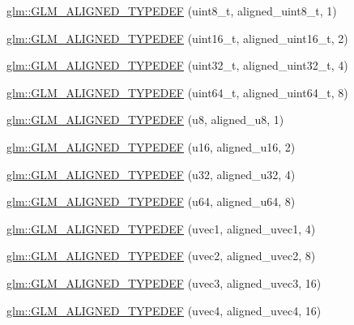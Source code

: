 \begin{DoxyCompactItemize}
\item 
\hyperlink{group__gtx__type__aligned_gaf6ced36f13bae57f377bafa6f5fcc299}{glm\-::\-G\-L\-M\-\_\-\-A\-L\-I\-G\-N\-E\-D\-\_\-\-T\-Y\-P\-E\-D\-E\-F} (uint8\-\_\-t, aligned\-\_\-uint8\-\_\-t, 1)
\item 
\hyperlink{group__gtx__type__aligned_gafbc7fb7847bfc78a339d1d371c915c73}{glm\-::\-G\-L\-M\-\_\-\-A\-L\-I\-G\-N\-E\-D\-\_\-\-T\-Y\-P\-E\-D\-E\-F} (uint16\-\_\-t, aligned\-\_\-uint16\-\_\-t, 2)
\item 
\hyperlink{group__gtx__type__aligned_gaa86bc56a73fd8120b1121b5f5e6245ae}{glm\-::\-G\-L\-M\-\_\-\-A\-L\-I\-G\-N\-E\-D\-\_\-\-T\-Y\-P\-E\-D\-E\-F} (uint32\-\_\-t, aligned\-\_\-uint32\-\_\-t, 4)
\item 
\hyperlink{group__gtx__type__aligned_ga68c0b9e669060d0eb5ab8c3ddeb483d8}{glm\-::\-G\-L\-M\-\_\-\-A\-L\-I\-G\-N\-E\-D\-\_\-\-T\-Y\-P\-E\-D\-E\-F} (uint64\-\_\-t, aligned\-\_\-uint64\-\_\-t, 8)
\item 
\hyperlink{group__gtx__type__aligned_ga4f3bab577daf3343e99cc005134bce86}{glm\-::\-G\-L\-M\-\_\-\-A\-L\-I\-G\-N\-E\-D\-\_\-\-T\-Y\-P\-E\-D\-E\-F} (u8, aligned\-\_\-u8, 1)
\item 
\hyperlink{group__gtx__type__aligned_ga13a2391339d0790d43b76d00a7611c4f}{glm\-::\-G\-L\-M\-\_\-\-A\-L\-I\-G\-N\-E\-D\-\_\-\-T\-Y\-P\-E\-D\-E\-F} (u16, aligned\-\_\-u16, 2)
\item 
\hyperlink{group__gtx__type__aligned_ga197570e03acbc3d18ab698e342971e8f}{glm\-::\-G\-L\-M\-\_\-\-A\-L\-I\-G\-N\-E\-D\-\_\-\-T\-Y\-P\-E\-D\-E\-F} (u32, aligned\-\_\-u32, 4)
\item 
\hyperlink{group__gtx__type__aligned_ga0f033b21e145a1faa32c62ede5878993}{glm\-::\-G\-L\-M\-\_\-\-A\-L\-I\-G\-N\-E\-D\-\_\-\-T\-Y\-P\-E\-D\-E\-F} (u64, aligned\-\_\-u64, 8)
\item 
\hyperlink{group__gtx__type__aligned_ga509af83527f5cd512e9a7873590663aa}{glm\-::\-G\-L\-M\-\_\-\-A\-L\-I\-G\-N\-E\-D\-\_\-\-T\-Y\-P\-E\-D\-E\-F} (uvec1, aligned\-\_\-uvec1, 4)
\item 
\hyperlink{group__gtx__type__aligned_ga94e86186978c502c6dc0c0d9c4a30679}{glm\-::\-G\-L\-M\-\_\-\-A\-L\-I\-G\-N\-E\-D\-\_\-\-T\-Y\-P\-E\-D\-E\-F} (uvec2, aligned\-\_\-uvec2, 8)
\item 
\hyperlink{group__gtx__type__aligned_ga5cec574686a7f3c8ed24bb195c5e2d0a}{glm\-::\-G\-L\-M\-\_\-\-A\-L\-I\-G\-N\-E\-D\-\_\-\-T\-Y\-P\-E\-D\-E\-F} (uvec3, aligned\-\_\-uvec3, 16)
\item 
\hyperlink{group__gtx__type__aligned_ga47edfdcee9c89b1ebdaf20450323b1d4}{glm\-::\-G\-L\-M\-\_\-\-A\-L\-I\-G\-N\-E\-D\-\_\-\-T\-Y\-P\-E\-D\-E\-F} (uvec4, aligned\-\_\-uvec4, 16)

\end{DoxyCompactItemize}

